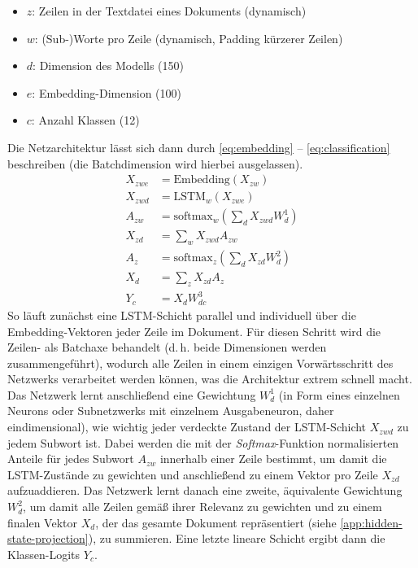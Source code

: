 \documentclass[bachelor,german]{info1thesis}
\begin{document}
%
\begin{itemize}
\itemsep-.5em
\item $z$: Zeilen in der Textdatei eines Dokuments (dynamisch)
\item $w$: (Sub-)Worte pro Zeile (dynamisch, Padding kürzerer Zeilen)
\item $d$: Dimension des Modells (150)
\item $e$: Embedding-Dimension (100)
\item $c$: Anzahl Klassen (12)
\end{itemize}
%
Die Netzarchitektur lässt sich dann durch \autoref{eq:embedding} -- \ref{eq:classification} beschreiben (die Batchdimension wird hierbei ausgelassen).
%
\begin{align}
X_{zwe} &= \text{Embedding}(X_{zw}) \label{eq:embedding} \\
X_{zwd} &= \text{LSTM}_w(X_{zwe}) \label{eq:lstm} \\
A_{zw} &= \text{softmax}_w\left(\sum_d X_{zwd} W_{d}^1\right) \\
X_{zd} &= \sum_w X_{zwd} A_{zw} \label{eq:zd} \\
A_{z} &= \text{softmax}_z\left(\sum_d X_{zd} W_{d}^2\right) \label{eq:az} \\
X_{d} &= \sum_z X_{zd} A_z \label{eq:d} \\
Y_c &= X_d W_{dc}^3 \label{eq:classification}
\end{align}
%
So läuft zunächst eine LSTM-Schicht parallel und individuell über die Embedding-Vektoren jeder Zeile im Dokument. Für diesen Schritt wird die Zeilen- als Batchaxe behandelt (d.\,h. beide Dimensionen werden zusammengeführt), wodurch alle Zeilen in einem einzigen Vorwärtsschritt des Netzwerks verarbeitet werden können, was die Architektur extrem schnell macht. Das Netzwerk lernt anschließend eine Gewichtung $W_d^1$ (in Form eines einzelnen Neurons oder Subnetzwerks mit einzelnem Ausgabeneuron, daher eindimensional), wie wichtig jeder verdeckte Zustand der LSTM-Schicht $X_{zwd}$ zu jedem Subwort ist. Dabei werden die mit der \textit{Softmax}-Funktion normalisierten Anteile für jedes Subwort $A_{zw}$ innerhalb einer Zeile bestimmt, um damit die LSTM-Zustände zu gewichten und anschließend zu einem Vektor pro Zeile $X_{zd}$ aufzuaddieren. Das Netzwerk lernt danach eine zweite, äquivalente Gewichtung $W_d^2$, um damit alle Zeilen gemäß ihrer Relevanz zu gewichten und zu einem finalen Vektor $X_d$, der das gesamte Dokument repräsentiert (siehe \autoref{app:hidden-state-projection}), zu summieren. Eine letzte lineare Schicht ergibt dann die Klassen-Logits $Y_c$.
\end{document}
